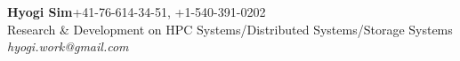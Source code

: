 {\textbf{\Large Hyogi Sim}\hfill{\small +41-76-614-34-51, +1-540-391-0202}}\\
{\small
{Research \& Development on HPC Systems/Distributed Systems/Storage Systems}
    \hfill{\emph{\small hyogi.work@gmail.com}}\\
}
